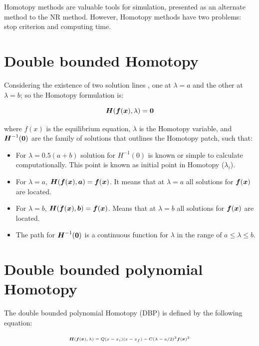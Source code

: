 \documentclass[journal,twocolumn]{IEEEtran}
\newcommand{\pig}[1]{\mbox{\boldmath ${#1}$}	}
\begin{document}
Homotopy methods \cite{BHLHOM,homo_ushida1,homo_green2,homo_DWolfMulti,homo_ArtificialP} are valuable tools for simulation, presented as an alternate method to the NR method. However, Homotopy methods have two problems: stop criterion and computing time.

\section{Double bounded Homotopy}

Considering the existence of two solution lines \cite{homo_iscas05,homo_iberchip03}, one at $\lambda=a$ and the other at $\lambda=b$; so the Homotopy formulation is:

\begin{equation}
\pig{H}(\pig{f}(\pig{x}),\lambda ) =\pig{0}
\label{H2M}
\end{equation}

where $f(x)$ is the equilibrium equation, $\lambda$ is the Homotopy variable, and $\pig{H}^{-1}(\pig{0})$ are the family of solutions that outlines the Homotopy patch, such that:

\begin{itemize}
\item For $\lambda=0.5(a+b)$ solution for $H^{-1}(0)$ is known or simple to calculate computationally. This point is known as initial point in Homotopy ($\lambda_i$).
\item For $\lambda=a$, $\pig{H}(\pig{f}(\pig{x}),\pig{a} )=\pig{f}(\pig{x})$. It means that at $\lambda=a$ all solutions for $\pig{f}(\pig{x})$ are located.
\item For $\lambda=b$, $\pig{H}(\pig{f}(\pig{x}),\pig{b} )=\pig{f}(\pig{x})$. Means that at $\lambda=b$ all solutions for $\pig{f}(\pig{x})$ are located.
\item The path for $\pig{H}^{-1}(\pig{0})$  is a continuous function for $\lambda$ in the range of $a \leq \lambda \leq b $. 
\end{itemize}

\section{Double bounded polynomial Homotopy}

The double bounded polynomial Homotopy (DBP) is defined by the following equation:

\begin{equation}
{\tiny
\begin{array}{l}
\pig{H}(\pig{f}(\pig{x}),\lambda )=Q(x-x_i)(x-x_f) -C(\lambda-a/2)^2 \pig{f}(\pig{x})^2
\end{array}}
\label{homotopiaP}
\end{equation}
\end{document}
